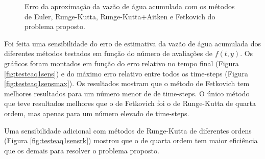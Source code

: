 \documentclass[final,5p]{elsarticle}
\numberwithin{equation}{section}
\begin{document}
        \begin{figure}[hbt!]
            \caption{Erro da aproximação da vazão de água acumulada com os métodos de Euler, Runge-Kutta, Runge-Kutta+Aitken e Fetkovich do problema proposto.}
            \label{fig:testeaq1errowe}
        \end{figure}

        Foi feita uma sensibilidade do erro de estimativa da vazão de água acumulada dos diferentes métodos testados em função do número de avaliações de $f(t,y)$. Os gráficos foram montados em função do erro relativo no tempo final (Figura \ref{fig:testeaq1sens}) e do máximo erro relativo entre todos os time-steps (Figura \ref{fig:testeaq1sensmax}). Os resultados mostram que o método de Fetkovich tem melhores resultados para um número menor de de time-steps. O único método que teve resultados melhores que o de Fetkovich foi o de Runge-Kutta de quarta ordem, mas apenas para um número elevado de time-steps.

        Uma sensibilidade adicional com métodos de Runge-Kutta de diferentes ordens (Figura \ref{fig:testeaq1sensrk}) mostrou que o de quarta ordem tem maior eficiência que os demais para resolver o problema proposto.
\end{document}
